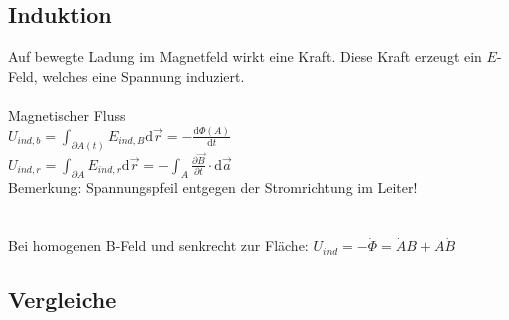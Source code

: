\documentclass[10pt,a4paper]{scrartcl}
\begin{document}
\subsection{Induktion}
Auf bewegte Ladung im Magnetfeld wirkt eine Kraft. Diese Kraft erzeugt ein $E$-Feld, welches eine Spannung induziert.\\
\\
Magnetischer Fluss \\
$U_{ind,b}=\int_{\partial A(t)} E_{ind,B} \mathrm d\vec r = - \frac{\mathrm d\Phi(A)}{\mathrm dt}$\\
$U_{ind,r}=\int_{\partial A} E_{ind,r} \mathrm d\vec r = - \int_A \frac{\partial \vec B}{\partial t} \cdot \mathrm d\vec a$\\

Bemerkung: Spannungspfeil entgegen der Stromrichtung im Leiter!\\
\\
\\
Bei homogenen B-Feld und senkrecht zur Fläche: $U_{ind}=- \dot \Phi = \dot A B + A \dot B$\\





\subsection{Vergleiche}

\setlength{\tabcolsep}{10pt}
\renewcommand{\arraystretch}{1.8}
\end{document}
